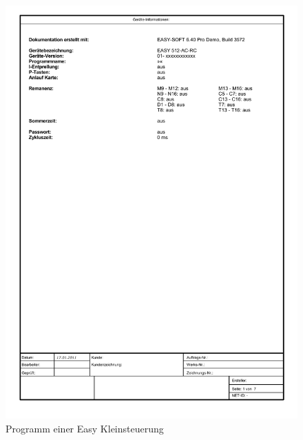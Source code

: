 \begin{figure}[H]
	\centering
	\includegraphics[page=2, clip, trim=2.5cm 20cm 6.9cm 2.5cm, width=1.00\textwidth]{./code/GartenEasy.pdf}
	\caption{Programm einer Easy Kleinsteuerung}
	\label{fig:easyprogram}
\end{figure}

